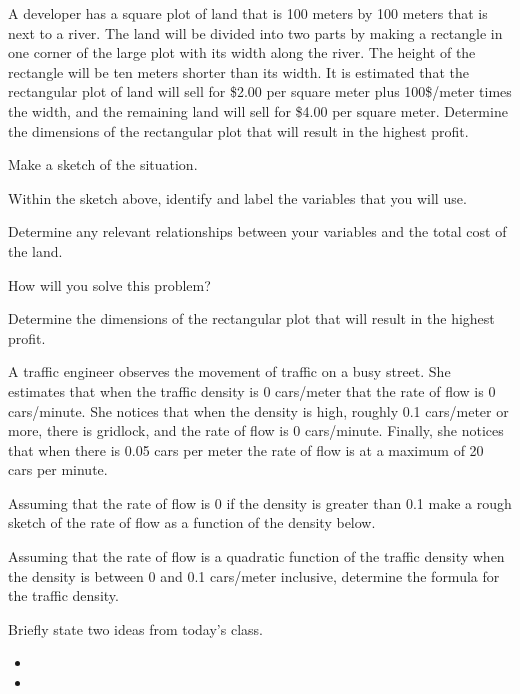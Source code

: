 \begin{problem}
\item A developer has a square plot of land that is 100 meters by 100
  meters that is next to a river. The land will be divided into two
  parts by making a rectangle in one corner of the large plot with its
  width along the river. The height of the rectangle will be ten
  meters shorter than its width. It is estimated that the rectangular
  plot of land will sell for \$2.00 per square meter plus 100\$/meter
  times the width, and the remaining land will sell for \$4.00 per
  square meter.  Determine the dimensions of the rectangular plot that
  will result in the highest profit.
  \begin{subproblem}
    \item Make a sketch of the situation.
      \vfill
    \item Within the sketch above, identify and label the variables
      that you will use.
    \item Determine any relevant relationships between your variables
      and the total cost of the land.
    \item How will you solve this problem?
      \vfill
    \item Determine the dimensions of the rectangular plot that will
      result in the highest profit.
      \vfill
      \vfill
  \end{subproblem}
  \clearpage
\item A traffic engineer observes the movement of traffic on a busy
  street. She estimates that when the traffic density is 0 cars/meter
  that the rate of flow is 0 cars/minute. She notices that when the
  density is high, roughly 0.1 cars/meter or more, there is gridlock,
  and the rate of flow is 0 cars/minute. Finally, she notices that
  when there is 0.05 cars per meter the rate of flow is at a maximum
  of 20 cars per minute.
  \begin{subproblem}
  \item Assuming that the rate of flow is 0 if the density is greater
    than 0.1 make a rough sketch of the rate of flow as a function of
    the density below.  
    \vfill
  \item Assuming that the rate of flow is a quadratic function of the
    traffic density when the density is between 0 and 0.1 cars/meter
    inclusive, determine the formula for the traffic density.
    \vfill
  \end{subproblem}
\end{problem}

\postClass

\begin{problem}
\item Briefly state two ideas from today's class.
  \begin{itemize}
  \item 
  \item 
  \end{itemize}
\item 
  \begin{subproblem}
    \item
  \end{subproblem}
\end{problem}



